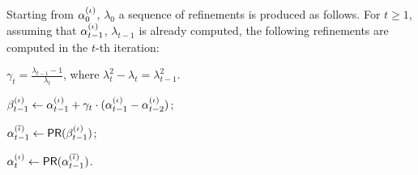 {\begin{definition}
	Starting from $\alpha^{(\iota)}_0$, $\lambda_0$
	a sequence of refinements is produced as follows.
	For $t \geq 1$, assuming that $\alpha^{(\iota)}_{t-1}$, $\lambda_{t-1}$ is already computed,
	the following refinements are computed in the $t$-th iteration:
	\begin{compactitem}
		\item 
		\item $\gamma_t = \frac{\lambda_{t-1}-1}{\lambda_t}$, where $\lambda_t^2 - \lambda_t = \lambda_{t-1}^2$.
		\item $\beta^{(\iota)}_{t-1} \gets \alpha^{(\iota)}_{t-1} + \gamma_t\cdot (\alpha^{(\iota)}_{t-1} - \alpha^{(\iota)}_{t-2})$;
		\item $\alpha^{(\overline{\iota})}_{t-1} \gets {\mathsf {PR}}(\beta^{(\iota)}_{t-1})$;
		\item $\alpha^{(\iota)}_{t} \gets {\mathsf {PR}}(\alpha^{(\overline{\iota})}_{t-1})$.
	\end{compactitem}
\end{definition}
}